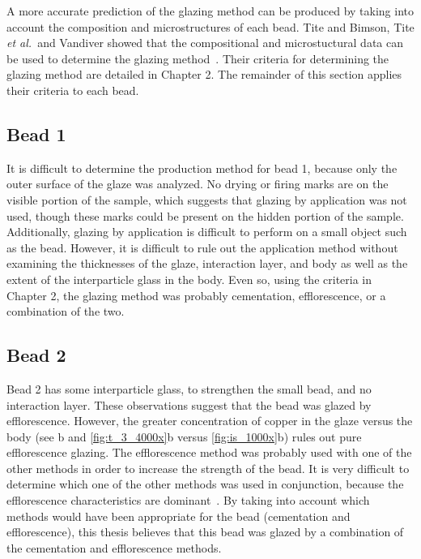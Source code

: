 A more accurate prediction of the glazing method can be produced by taking into account the composition and microstructures of each bead. Tite and Bimson, Tite \emph{et al.}\, and Vandiver showed that the compositional and microstuctural data can be used to determine the glazing method~\cite{tite86,tite07,vandiver98}. Their criteria for determining the glazing method are detailed in Chapter 2. The remainder of this section applies their criteria to each bead.

\subsection{Bead 1}

It is difficult to determine the production method for bead 1, because only the outer surface of the glaze was analyzed. No drying or firing marks are on the visible portion of the sample, which suggests that glazing by application was not used, though these marks could be present on the hidden portion of the sample. Additionally, glazing by application is difficult to perform on a small object such as the bead. However, it is difficult to rule out the application method without examining the thicknesses of the glaze, interaction layer, and body as well as the extent of the interparticle glass in the body. Even so, using the criteria in Chapter 2, the glazing method was probably cementation, efflorescence, or a combination of the two.

\subsection{Bead 2}

Bead 2 has some interparticle glass, to strengthen the small bead, and no interaction layer. These observations suggest that the bead was glazed by efflorescence. However, the greater concentration of copper in the glaze versus the body (see b and \ref{fig:t_3_4000x}b versus \autoref{fig:is_1000x}b) rules out pure efflorescence glazing. The efflorescence method was probably used with one of the other methods in order to increase the strength of the bead. It is very difficult to determine which one of the other methods was used in conjunction, because the efflorescence characteristics are dominant~\cite{vandiver83,nicholson93,tite83}. By taking into account which methods would have been appropriate for the bead (cementation and efflorescence), this thesis believes that this bead was glazed by a combination of the cementation and efflorescence methods.

